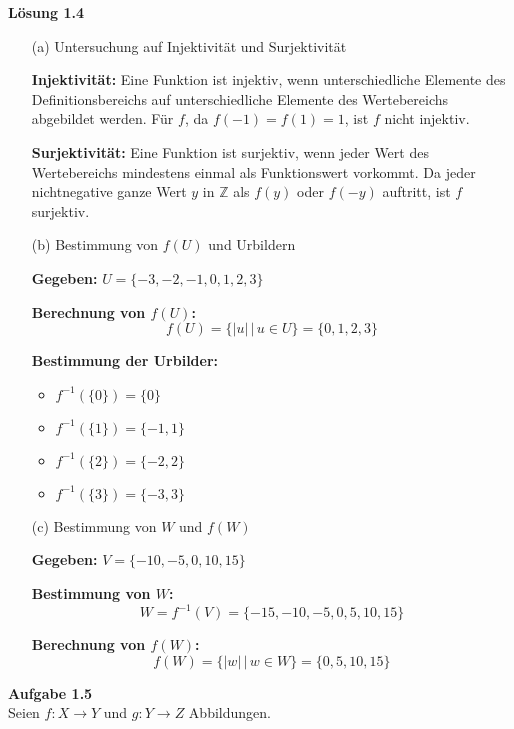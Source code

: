 \documentclass[%
    12pt,
    a4paper,
    ngerman,
    headheight=29.1pt,
]{scrartcl}
\newcommand{\Aufgabe}[1]{
  {
  \vspace*{0.5cm}
  \textsf{\textbf{Aufgabe #1}}
  \vspace*{0.2cm}
  }
}
\newcommand{\Loesung}[1]{
  {
  \vspace*{0.5cm}
  \textsf{\textbf{Lösung #1}}
  \vspace*{0.2cm}
  }
}
\begin{document}
\Loesung{1.4}\\
\begin{itemize}
    \item[(a)] Untersuchung auf Injektivität und Surjektivität
    
    \textbf{Injektivität:}
    Eine Funktion ist injektiv, wenn unterschiedliche Elemente des Definitionsbereichs auf unterschiedliche Elemente des Wertebereichs abgebildet werden. Für \( f \), da \( f(-1) = f(1) = 1 \), ist \( f \) nicht injektiv.
    
    \textbf{Surjektivität:}
    Eine Funktion ist surjektiv, wenn jeder Wert des Wertebereichs mindestens einmal als Funktionswert vorkommt. Da jeder nichtnegative ganze Wert \( y \) in \( \mathbb{Z} \) als \( f(y) \) oder \( f(-y) \) auftritt, ist \( f \) surjektiv.

    \item[(b)] Bestimmung von \( f(U) \) und Urbildern
    
    \textbf{Gegeben:} \( U = \{-3, -2, -1, 0, 1, 2, 3\} \)
    
    \textbf{Berechnung von \( f(U) \):}
    \[
    f(U) = \{ |u| \,|\, u \in U \} = \{0, 1, 2, 3\}
    \]
    
    \textbf{Bestimmung der Urbilder:}
    \begin{itemize}
        \item \( f^{-1}(\{0\}) = \{0\} \)
        \item \( f^{-1}(\{1\}) = \{-1, 1\} \)
        \item \( f^{-1}(\{2\}) = \{-2, 2\} \)
        \item \( f^{-1}(\{3\}) = \{-3, 3\} \)
    \end{itemize}

    \item[(c)]Bestimmung von \( W \) und \( f(W) \)
    
    \textbf{Gegeben:} \( V = \{-10, -5, 0, 10, 15\} \)
    
    \textbf{Bestimmung von \( W \):}
    \[
    W = f^{-1}(V) = \{-15, -10, -5, 0, 5, 10, 15\}
    \]
    
    \textbf{Berechnung von \( f(W) \):}
    \[
    f(W) = \{ |w| \,|\, w \in W \} = \{0, 5, 10, 15\}
    \]
\end{itemize}


\Aufgabe{1.5} \\
Seien \( f : X \rightarrow Y \) und \( g : Y \rightarrow Z \) Abbildungen.
\end{document}

